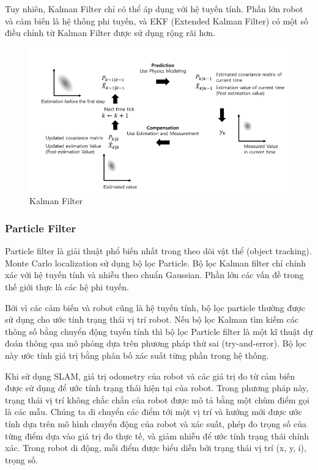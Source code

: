 Tuy nhiên, Kalman Filter chỉ có thể áp dụng với hệ tuyến tính. Phần lớn robot và cảm biến là hệ thống phi tuyến, và EKF (Extended Kalman Filter) có một số điều chỉnh từ Kalman Filter được sử dụng rộng rãi hơn.


\begin{figure}[htbp]
  \centering
  \includegraphics[width=\linewidth]{figures/BasicConceptKalmanFilter.png}
  \caption{Kalman Filter\cite{pyo2017ros}}
  \label{fig:BasicConceptKalmanFilter}
\end{figure}

\subsubsection*{Particle Filter}
Particle filter là giải thuật phổ biến nhất trong theo dõi vật thể (object tracking). Monte Carlo localization sử dụng bộ lọc Particle. Bộ lọc Kalman filter chỉ chính xác với hệ tuyến tính và nhiễu theo chuẩn Gaussian. Phần lớn các vấn đề trong thế giới thực là các hệ phi tuyến.

Bởi vì các cảm biến và robot cũng là hệ tuyến tính, bộ lọc particle thường được sử dụng cho ước tính trạng thái vị trí robot. Nếu bộ lọc Kalman tìm kiếm các thông số bằng chuyển động tuyến tính thì bộ lọc Particle filter là một kĩ thuật dự đoán thông qua mô phỏng dựa trên phương pháp thử sai (try-and-error). Bộ lọc này ước tính giá trị bằng phân bố xác suất từng phần trong hệ thống.

Khi sử dụng SLAM, giá trị odometry của robot và các giá trị đo từ cảm biến được sử dụng để ước tính trạng thái hiện tại của robot. Trong phương pháp này, trạng thái vị trí không chắc chắn của robot được mô tả bằng một chùm điểm gọi là các mẫu. Chúng ta di chuyển các điểm tới một vị trí và hướng mới được ước tính dựa trên mô hình chuyển động của robot và xác suất, phép đo trọng số của từng điểm dựa vào giá trị đo thực tế, và giảm nhiễu để ước tính trạng thái chính xác. Trong robot di động, mỗi điểm được biểu diễn bởi trạng thái vị trí (x, y, i), trọng số.

